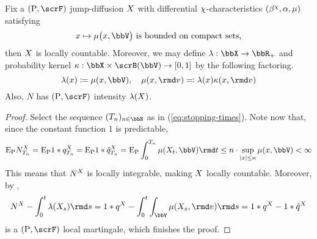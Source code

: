 \begin{lemma}
  \label{lemma:countable}
  Fix a $(\Prb, \scrF)$ jump-diffusion $X$ with differential $\chi$-characteristics $(\beta^\chi, \alpha, \mu)$ satisfying
  \begin{equation*}
    \stateVar \mapsto \affJump\big(\stateVar, \vecSpace\big) \text{ is bounded on compact sets,}
  \end{equation*}
  then $X$ is locally countable.
  Moreover, we may define $\affInt: \stateSpace \rightarrow \bbR_+$ and probability kernel $\affDist: \stateSpace \times \scrB(\vecSpace) \rightarrow [0,1]$ by the following factoring.
  \begin{equation*}
    \affInt(\stateVar) \defeq \affJump(\stateVar, \vecSpace), \quad \affJump(\stateVar, \rmd\markVar) \eqdef \affInt(\stateVar) \affDist(\stateVar, \rmd\markVar)
  \end{equation*}
  Also, $N$ has $(\Prb, \scrF)$ intensity $\lambda(X)$.
\end{lemma}
\begin{proof}
  \label{proof:lemma:countable}
  Select the sequence $(T_n)_{n\in\bbN}$ as in (\ref{eq:stopping-times}).
  Note now that, since the constant function $1$ is predictable,
  \begin{equation*}
    \Exp_\Prb \N^\X_{T_n}
    = \Exp_\Prb 1 \ast \jumpMeas^\X_{T_n}
    = \Exp_\Prb 1 \ast \predproj{\jumpMeas^\X}_{T_n}
    = \Exp_\Prb \int_0^{T_n} \affJump(\X_t, \vecSpace) \rmd t
    \leq n \cdot \sup_{|\stateVar| \leq n} \affJump(\stateVar, \vecSpace) < \infty
  \end{equation*}
  This means that $N^X$ is locally integrable, making $X$ locally countable.
  Moreover, by \cite[Theorem II.1.8]{jacod2003},
  \begin{equation*}
    \N^\X - \int_0^t \affInt(\X_s) \rmd s
    = 1 \ast \jumpMeas^\X - \int_0^t \int_\vecSpace \affJump(\X_s, \rmd\markVar) \rmd s
    = 1 \ast \jumpMeas^\X - 1 \ast \predproj{\jumpMeas^\X}
  \end{equation*}
  is a $(\Prb, \scrF)$ local martingale, which finishes the proof.
\end{proof}

